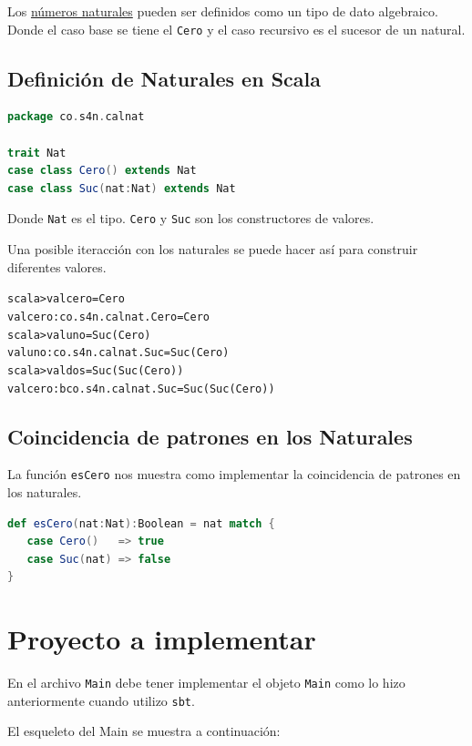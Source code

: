\documentclass[12pt]{article}
\newcounter{problema}
\begin{document}
Los \href{https://es.wikipedia.org/wiki/N%C3%BAmero_natural}{números naturales} pueden ser definidos como un tipo de dato algebraico. Donde el caso base se tiene el \texttt{Cero} y el caso recursivo es el sucesor de un natural.

\subsection{Definición de Naturales en Scala}
\label{sec:def-naturales}

\begin{lstlisting}[language=Scala]
package co.s4n.calnat

trait Nat
case class Cero() extends Nat
case class Suc(nat:Nat) extends Nat
\end{lstlisting}

Donde \texttt{Nat} es el tipo. \texttt{Cero} y \texttt{Suc} son los constructores de valores.

Una posible iteracción con los naturales se puede hacer así  para construir diferentes valores.

\begin{alltt}
scala> val cero = Cero
val cero: co.s4n.calnat.Cero = Cero
scala> val uno = Suc(Cero)
val uno: co.s4n.calnat.Suc = Suc(Cero)
scala> val dos = Suc(Suc(Cero))
val cero: bco.s4n.calnat.Suc = Suc(Suc(Cero))
\end{alltt}

\subsection{Coincidencia de patrones en los Naturales}
\label{sec:pat-nat}

La función \texttt{esCero} nos muestra como implementar la coincidencia de patrones en los naturales.

\begin{lstlisting}[language=Scala]
def esCero(nat:Nat):Boolean = nat match {
   case Cero()   => true
   case Suc(nat) => false
}
\end{lstlisting}

\section{Proyecto a implementar}
\label{sec:problema-resolver}

En el archivo \texttt{Main} debe tener implementar el objeto \texttt{Main} como lo hizo anteriormente cuando utilizo \texttt{sbt}.

El esqueleto del Main se muestra a continuación:
\end{document}
